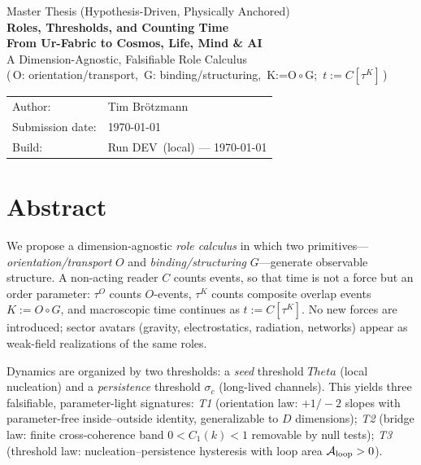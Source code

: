 \documentclass[12pt,a4paper,oneside]{scrreprt}
\def\BuildRun{DEV}\def\BuildSHA{local}\def\BuildDate{\today}%
\def\Theta{Theta}%
\begin{document}
\begin{titlepage}
  \centering
  {\Large Master Thesis (Hypothesis-Driven, Physically Anchored)}\\[0.6em]
  {\huge\bfseries Roles, Thresholds, and Counting Time}\\[0.25em]
  {\Large\bfseries From Ur-Fabric to Cosmos, Life, Mind \& AI}\\[1.0em]
  {\large A Dimension-Agnostic, Falsifiable Role Calculus}\\[-0.2em]
  {\small (\,O: orientation/transport,\ G: binding/structuring,\ K:=O$\!\circ$G;\ $t:=C[\tau^K]$\,)}\\[2.0em]

  \begin{tabular}{@{}ll@{}}
    Author: & Tim Brötzmann \\
    Submission date: & \today \\
    Build: & Run \BuildRun\ (\BuildSHA) — \BuildDate \\
  \end{tabular}

  \vfill
\end{titlepage}


\chapter*{Abstract}
We propose a dimension-agnostic \emph{role calculus} in which two primitives—
\emph{orientation/transport} $O$ and \emph{binding/structuring} $G$—generate 
observable structure. A non-acting reader $C$ counts events, so that time is not 
a force but an order parameter: $\tau^O$ counts $O$-events, $\tau^K$ counts 
composite overlap events $K:=O\!\circ G$, and macroscopic time continues as 
$t:=C[\tau^K]$. No new forces are introduced; sector avatars (gravity, electrostatics, 
radiation, networks) appear as weak-field realizations of the same roles.

Dynamics are organized by two thresholds: a \emph{seed} threshold $\Theta$ 
(local nucleation) and a \emph{persistence} threshold $\sigma_c$ (long-lived 
channels). This yields three falsifiable, parameter-light signatures: 
\emph{T1} (orientation law: $+1/-2$ slopes with parameter-free inside--outside 
identity, generalizable to $D$ dimensions); 
\emph{T2} (bridge law: finite cross-coherence band $0<C_1(k)<1$ removable 
by null tests); 
\emph{T3} (threshold law: nucleation--persistence hysteresis with loop area 
$\mathcal A_{\rm loop}>0$).
\end{document}
